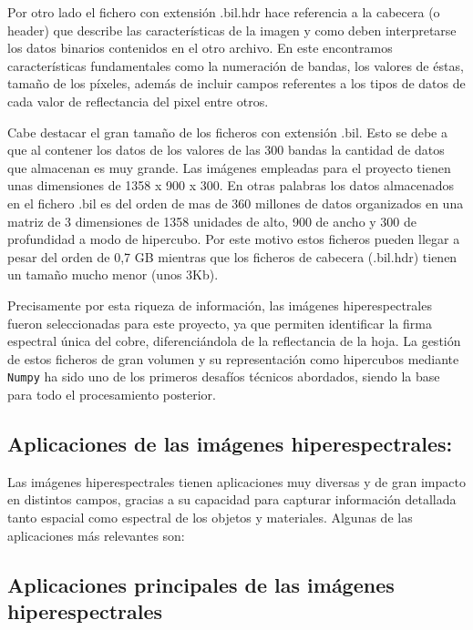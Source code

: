 Por otro lado el fichero con extensión .bil.hdr hace referencia a la cabecera (o header) que describe las características de la imagen y como deben interpretarse los datos binarios contenidos en el otro archivo. En este encontramos características fundamentales como la numeración de bandas, los valores de éstas,  tamaño de los píxeles, además de incluir campos referentes a los tipos de datos de cada valor de reflectancia del pixel entre otros.

Cabe destacar el gran tamaño de los ficheros con extensión .bil. Esto se debe a que al contener los datos de los valores de las 300 bandas la cantidad de datos que almacenan es muy grande. Las imágenes empleadas para el proyecto tienen unas dimensiones de 1358 x 900 x 300. En otras palabras los datos almacenados en el fichero .bil es del orden de mas de 360 millones de datos organizados en una matriz de 3 dimensiones de 1358 unidades de alto, 900 de ancho y 300 de profundidad a modo de hipercubo.
Por este motivo estos ficheros pueden llegar a pesar del orden de 0,7 GB  mientras que los ficheros de cabecera (.bil.hdr) tienen un tamaño mucho menor  (unos 3Kb). 


Precisamente por esta riqueza de información, las imágenes hiperespectrales fueron seleccionadas para este proyecto, ya que permiten identificar la firma espectral única del cobre, diferenciándola de la reflectancia de la hoja. La gestión de estos ficheros de gran volumen y su representación como hipercubos mediante \verb|Numpy| ha sido uno de los primeros desafíos técnicos abordados, siendo la base para todo el procesamiento posterior. 

\subsection{Aplicaciones de las imágenes hiperespectrales:}

Las imágenes hiperespectrales tienen aplicaciones muy diversas y de gran impacto en distintos campos, gracias a su capacidad para capturar información detallada tanto espacial como espectral de los objetos y materiales. Algunas de las aplicaciones más relevantes son:

\subsection{Aplicaciones principales de las imágenes hiperespectrales}

